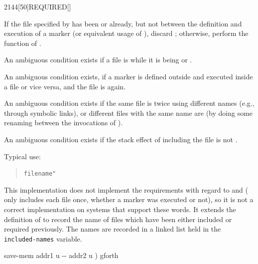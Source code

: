 \pagebreak
\begin{worddef}{2144}[50]{REQUIRED}[]%
\item {}

	If the file specified by  has been 
	or  already, but not between the definition and
	execution of a marker (or equivalent usage of ),
	discard ; otherwise, perform the function of
	.

	An ambiguous condition exists if a file is  while
	it is being  or .

	An ambiguous condition exists, if a marker is defined outside and
	executed inside a file or vice versa, and the file is
	 again.

	An ambiguous condition exists if the same file is 
	twice using different names (e.g., through symbolic links), or
	different files with the same name are  (by doing
	some renaming between the invocations of ).

	An ambiguous condition exists if the stack effect of including the
	file is not .

	\begin{rationale} %
		Typical use:
		\begin{quote}
			 \texttt{filename"} 
		\end{quote}
	\end{rationale}

	\begin{implement} %
		\dffamily
		This implementation does not implement the requirements with
		regard to  and  (
		only includes each file once, whether a marker was executed or
		not), so it is not a correct implementation on systems that
		support these words. It extends the definition of 
		to record the name of files which have been either included or
		required previously. The names are recorded in a linked list
		held in the \texttt{included-names} variable.

		\ttfamily
		\word{:} save-mem	 addr1 u -{}- addr2 u )  gforth \\
		  \\
		\tab {}  \\
		\tab {}   \\
		\tab {}   \word{ROT}   \word{;}


\end{implement}
\end{worddef}
